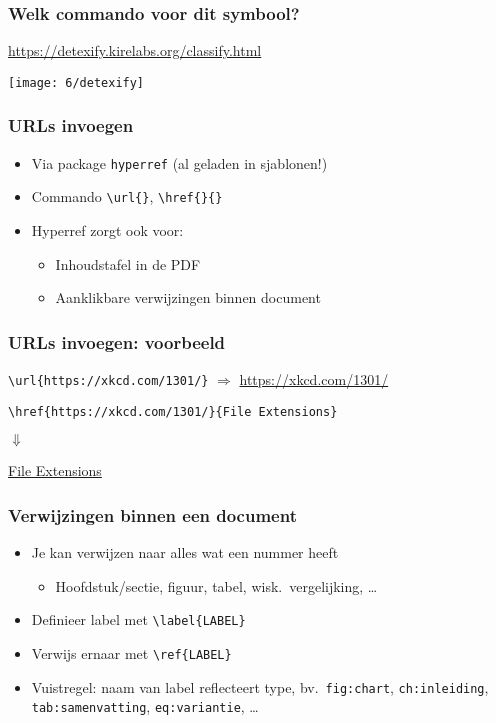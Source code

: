 \documentclass[aspectratio=169]{beamer}
\begin{document}
\begin{frame}
  \frametitle{Welk commando voor dit symbool?}

  \url{https://detexify.kirelabs.org/classify.html}

  \centering
  \texttt{[image: 6/detexify]}

\end{frame}

\begin{frame}[fragile]
  \frametitle{URLs invoegen}

  \begin{itemize}
    \item Via package \texttt{hyperref} (al geladen in sjablonen!)
    \item Commando \verb+\url{}+, \verb+\href{}{}+
    \item Hyperref zorgt ook voor:
          \begin{itemize}
            \item Inhoudstafel in de PDF
            \item Aanklikbare verwijzingen binnen document
          \end{itemize}
  \end{itemize}

\end{frame}

\begin{frame}[fragile]
  \frametitle{URLs invoegen: voorbeeld}

  \verb+\url{https://xkcd.com/1301/}+ $\Rightarrow$ \url{https://xkcd.com/1301/}

  \bigskip

  \verb+\href{https://xkcd.com/1301/}{File Extensions}+

  $\Downarrow$

  \href{https://xkcd.com/1301/}{File Extensions}

\end{frame}

\begin{frame}[fragile]
  \frametitle{Verwijzingen binnen een document}

  \begin{itemize}
    \item Je kan verwijzen naar alles wat een nummer heeft
          \begin{itemize}
            \item Hoofdstuk/sectie, figuur, tabel, wisk.~vergelijking, \ldots
          \end{itemize}
    \item Definieer label met \verb+\label{LABEL}+
    \item Verwijs ernaar met \verb+\ref{LABEL}+
    \item Vuistregel: naam van label reflecteert type, bv.~\texttt{fig:chart}, \texttt{ch:inleiding}, \texttt{tab:samenvatting}, \texttt{eq:variantie}, \ldots
  \end{itemize}

\end{frame}
\end{document}
